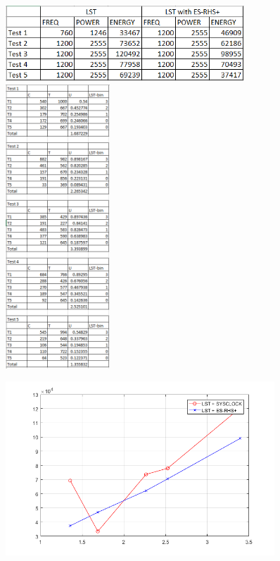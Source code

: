 \documentclass[letterpaper,12pt]{article}
\begin{document}
	\begin{figure}
		\centering
		\includegraphics[width=0.8\textwidth]{./img/T3}\\
		\includegraphics[width=0.35\textwidth]{./img/T4}\\
	\end{figure}
	\newpage
	\begin{figure}
		\centering
		\includegraphics[width=0.9\textwidth]{./img/result}\\
	\end{figure}
\end{document}
